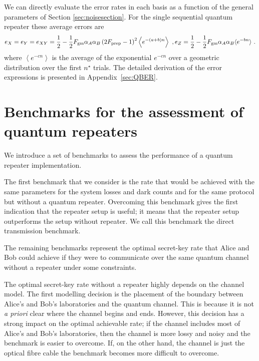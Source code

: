 \documentclass[aps,pra,reprint,superscriptaddress]{revtex4-1}
\newcommand{\nstar}{n^{\star}}
\begin{document}
We can directly evaluate the error rates in each basis as a function of the general parameters of Section \ref{sec:noisesection}. For the single sequential quantum repeater these average errors are
\begin{equation}
e_X = e_Y = e_{XY} =\frac{1}{2}-\frac{1}{2}F_{\textrm{gm}}\alpha_A \alpha_B\left(2F_{\textrm{prep}}-1\right)^2\left\langle e^{-\left(a+b\right)n} \right\rangle\ ,\label{eq:avgex}\\
e_Z = \frac{1}{2}-\frac{1}{2}F_{\textrm{gm}}\alpha_A \alpha_B\langle e^{-bn}\rangle\label{eq:avgez}\ .
\end{equation}
where $\left\langle e^{-cn}\right\rangle$ is the average of the exponential $e^{-cn}$ over a geometric distribution over the first $\nstar$ trials. 
The detailed derivation of the error expressions is presented in Appendix~\ref{sec:QBER}. 










\section{Benchmarks for the assessment of quantum repeaters}
\label{sec:assessing}
We introduce a set of benchmarks to assess the performance of a quantum repeater implementation. 

The first benchmark that we consider is the rate that would be achieved with the same parameters for the system losses and dark counts and for the same protocol but without a quantum repeater. Overcoming this benchmark gives the first indication that the repeater setup is useful; it means that the repeater setup outperforms the setup without repeater. We call this benchmark the direct transmission benchmark.

The remaining benchmarks represent the optimal secret-key rate that Alice and Bob could achieve if they were to communicate over the same quantum channel without a repeater under some constraints.

The optimal secret-key rate without a repeater highly depends on the channel model. The first modelling decision is the placement of the boundary between Alice's and Bob's laboratories and the quantum channel.
This is because it is not \emph{a priori} clear where the channel begins and ends. However, this decision has a strong impact on the optimal achievable rate; if the channel includes most of Alice's and Bob's laboratories, then the channel is more lossy and noisy and the benchmark is easier to overcome. If, on the other hand, the channel is just the optical fibre cable the benchmark becomes more difficult to overcome.\\
\end{document}
